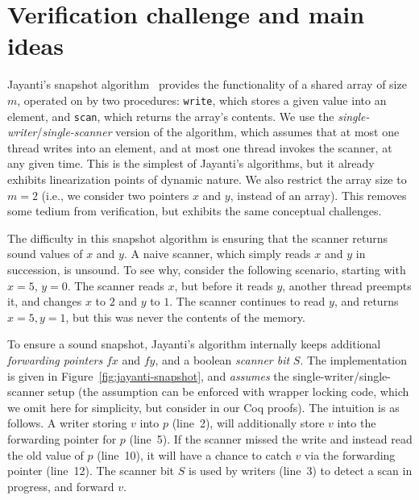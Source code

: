 \section{Verification challenge and main ideas}
\label{sc:overview}




\newcommand{\fx}{fx}
\newcommand{\fy}{fy}
\newcommand{\x}{x}
\newcommand{\y}{y}
\newcommand{\s}{S}

Jayanti's snapshot algorithm~\cite{Jayanti:STOC05} provides the
functionality of a shared array of size $m$, operated on by two
procedures: {\tt write}, which stores a given value into an element,
and {\tt scan}, which returns the array's contents. We use the
\emph{single-writer}/\emph{single-scanner} version of the algorithm,
which assumes that at most one thread writes into an element, and at
most one thread invokes the scanner, at any given time.
% 
This is the simplest of Jayanti's algorithms, but it already exhibits
linearization points of dynamic nature. We also
restrict the array size to $m=2$ (i.e., we consider two pointers $\x$
and $\y$, instead of an array). This removes some tedium from
verification, but exhibits the same conceptual challenges.
 
The difficulty in this snapshot algorithm is ensuring that the scanner
returns sound values of $\x$ and $\y$. A naive scanner, which simply
reads $\x$ and $\y$ in succession, is unsound. To see why, consider
the following scenario, starting with $\x=5$, $\y=0$. The scanner
reads $\x$, but before it reads $\y$, another thread preempts it, and
changes $\x$ to $2$ and $\y$ to $1$. The scanner continues to read
$\y$, and returns $\x=5, \y=1$, but this was never the contents of the
memory.

To ensure a sound snapshot, Jayanti's algorithm internally keeps
additional \emph{forwarding pointers} $\fx$ and $\fy$, and a boolean
\emph{scanner bit} $\s$. The implementation is given in
Figure~\ref{fig:jayanti-snapshot}, and \emph{assumes} the
single-writer/single-scanner setup (the assumption can be enforced
with wrapper locking code, which we omit here for simplicity, but
consider in our Coq proofs).
%
The intuition is as follows. A writer storing $v$ into $p$ (line~2),
will additionally store $v$ into the forwarding pointer for $p$
(line~5). If the scanner missed the write and instead read the old
value of $p$ (line~10), it will have a chance to catch $v$ via the
forwarding pointer (line~12). The scanner bit $S$ is used by writers
(line~3) to detect a scan in progress, and forward $v$.


